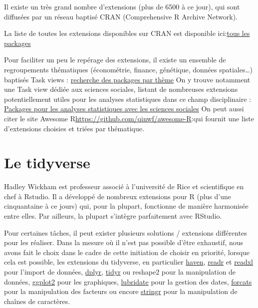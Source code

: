 \documentclass[
]{book}
\begin{document}
Il existe un très grand nombre d'extensions (plus de 6500 à ce jour), qui sont diffusées par un réseau baptisé CRAN (Comprehensive R Archive Network).

La liste de toutes les extensions disponibles sur CRAN est disponible ici:\href{https://cran.r-project.org/web/packages/available_packages_by_date.html}{tous les packages}

Pour faciliter un peu le repérage des extensions, il existe un ensemble de regroupements thématiques (économétrie, finance, génétique, données spatiales\ldots) baptisés Task views :
\href{http://cran.r-project.org/web/views/}{recherche des packages par thème}
On y trouve notamment une Task view dédiée aux sciences sociales, listant de nombreuses extensions potentiellement utiles pour les analyses statistiques dans ce champ disciplinaire :
\href{http://cran.r-project.org/web/views/SocialSciences.html.}{Packages pour les analyses statistiques avec les sciences sociales}
On peut aussi citer le site Awesome R\url{https://github.com/qinwf/awesome-R}:qui fournit une liste d'extensions choisies et triées par thématique.

\hypertarget{le-tidyverse}{%
\section{Le tidyverse}\label{le-tidyverse}}

Hadley Wickham est professeur associé à l'université de Rice et scientifique en chef à Rstudio. Il a développé de nombreux extensions pour R (plus d'une cinquantaine à ce jours) qui, pour la plupart, fonctionne de manière harmonisée entre elles. Par ailleurs, la plupart s'intègre parfaitement avec RStudio.

Pour certaines tâches, il peut exister plusieurs solutions / extensions différentes pour les réaliser. Dans la mesure où il n'est pas possible d'être exhaustif, nous avons fait le choix dans le cadre de cette initiation de choisir en priorité, lorsque cela est possible, les extensions du tidyverse, en particulier \href{http://rdrr.io/pkg/haven}{haven}, \href{http://rdrr.io/pkg/readr}{readr} et \href{http://rdrr.io/pkg/readxl}{readxl} pour l'import de données, \href{http://rdrr.io/pkg/dplyr}{dplyr}, \href{http://rdrr.io/pkg/dplyr}{tidyr} ou reshape2 pour la manipulation de données, \href{}{ggplot2} pour les graphiques, \href{http://rdrr.io/pkg/lubridate}{lubridate} pour la gestion des dates, \href{http://rdrr.io/pkg/forcats}{forcats} pour la manipulation des facteurs ou encore \href{http://rdrr.io/pkg/stringr}{stringr} pour la manipulation de chaînes de caractères.

  
\end{document}
